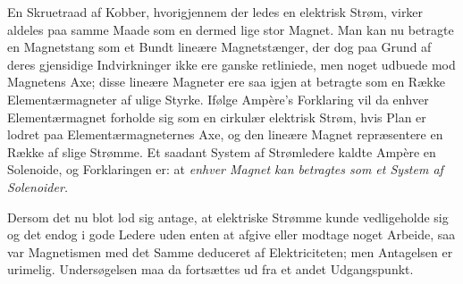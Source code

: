 \documentclass[12pt,a4paper]{book}
\begin{document}
En Skruetraad af Kobber, hvorigjennem der ledes en elektrisk Strøm,
virker aldeles paa samme Maade som en dermed lige stor Magnet. Man kan
nu betragte en Magnetstang som et Bundt lineære Magnetstænger, der dog
paa Grund af deres gjensidige Indvirkninger ikke ere ganske
retliniede, men noget udbuede mod Magnetens Axe; disse lineære
Magneter ere saa igjen at betragte som en Række Elementærmagneter af
ulige Styrke. Ifølge Ampère's Forklaring vil da enhver
Elementærmagnet forholde sig som en cirkulær elektrisk Strøm, hvis
Plan er lodret paa Elementærmagneternes Axe, og den lineære Magnet
repræsentere en Række af slige Strømme. Et saadant System af
Strømledere kaldte Ampère en Solenoide, og Forklaringen er: at
\emph{enhver Magnet kan betragtes som et System af Solenoider.}

Dersom det nu blot lod sig antage, at elektriske Strømme kunde
vedligeholde sig og det endog i gode Ledere uden enten at afgive eller
modtage noget Arbeide, saa var Magnetismen med det Samme deduceret af
Elektriciteten; men Antagelsen er urimelig. Undersøgelsen maa da
fortsættes ud fra et andet Udgangspunkt.
\end{document}
